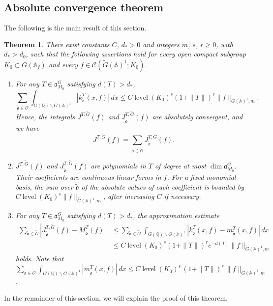 \documentclass[12pt]{amsart}
\theoremstyle{definition}
\theoremstyle{plain}
\newtheorem{theorem}[definition]{Theorem}
\theoremstyle{remark}
\def\Q{\mathbb{Q}}%
\def\A{\mathbb{A}}%
\def\bs{\backslash}%
\newcommand{\fa}{\mathfrak{a}}
\newcommand{\cC}{\mathcal{C}}
\numberwithin{equation}{section}
\newcommand{\tG}{\widetilde{G}}
\newcommand{\tfo}{\widetilde{\mathfrak{o}}}
\newcommand{\tcO}{\widetilde{\mathcal{O}}}
\newcommand{\level}{\operatorname{level}}
\begin{document}
\subsection{Absolute convergence theorem}

The following is the main result of this section.
\begin{theorem}\label{thm:main theorem 1}
There exist constants $C$, $d_*>0$ and integers $m$, $s$, $r\geq0$,
with $d_*>d_0$, such that the following assertions hold for
every open compact subgroup $K_0\subset G(\A_f)$ and 
every $f\in\cC(\tG(\A)^1;K_0)$.  
\begin{enumerate}[(1)]
\item For any $T\in\fa_{M_0}^G$ satisfying $d(T)>d_*$,
\[
 \sum_{\tfo\in\tcO}\int_{G(\Q)\bs G(\A)^1}|k_{\tfo}^T(x,f)| \,dx
\leq C\level(K_0)^s
       (1+\|T\|)^r\|f\|_{\tG(\A)^1,m}.
\]
Hence, the integrals $J^{T,\tG}(f)$ and $J_{\tfo}^{T,\tG}(f)$ are absolutely convergent, and we have
\[
J^{T,\tG}(f)=\sum_{\tfo\in\tcO}J_{\tfo}^{T,\tG}(f).
\]


\item 
$J^{T,\tG}(f)$ and $J_{\tfo}^{T,\tG}(f)$ are polynomials in
$T$ of degree at most
$\dim\fa_{M_0}^{G}$.
Their coefficients are continuous linear forms in $f$.
For a fixed monomial basis, the sum over $\tfo$ of the absolute
values of each coefficient is bounded by $C\level(K_0)^s\|f\|_{\tG(\A)^1,m}$, after increasing $C$ if necessary.

\item For any $T\in\fa_{M_0}^G$ satisfying $d(T)>d_*$, the approximation estimate
\begin{align*}
 \sum_{\tfo\in\tcO}
   |J_{\tfo}^{T,\tG}(f)-M_{\tfo}^T(f)|
 &\leq \sum_{\tfo\in\tcO}\int_{G(\Q)\bs G(\A)^1} |k_{\tfo}^T(x,f)-m_{\tfo}^T(x,f)|\, dx  \nonumber\\
 &\leq C\level(K_0)^s
       (1+\|T\|)^r e^{-d(T)}\|f\|_{\tG(\A)^1,m}
\end{align*}
holds. 
Note that $\sum_{\tfo\in\tcO}\int_{G(\Q)\bs G(\A)^1}|m_{\tfo}^T(x,f)| \,dx\le C\level(K_0)^s\, (1+\|T\|)^r\, \|f\|_{\tG(\A)^1,m}$. 
\end{enumerate}
\end{theorem}
In the remainder of this section, we will explain the proof of this theorem.
\end{document}
